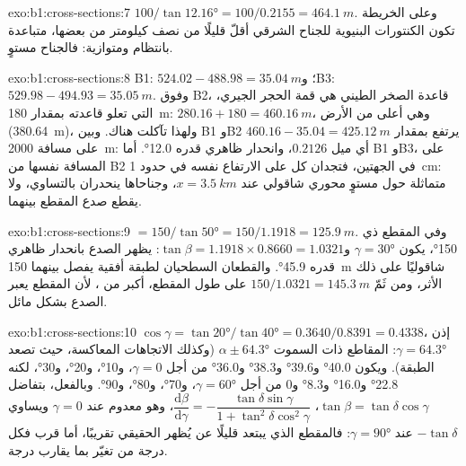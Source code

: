 \begin{solution}{exo:b1:cross-sections:7}
$100/\tan\ang{12.16} = 100/0.2155 = \qty{464.1}{m}$. وعلى الخريطة تكون الكنتورات البنيوية للجناح الشرقي أقلّ قليلًا من نصف كيلومتر من بعضها، متباعدة بانتظام ومتوازية: فالجناح مستوٍ.
\end{solution}

\begin{solution}{exo:b1:cross-sections:8}
B1: $524.02 - 488.98 = \qty{35.04}{m}$؛ وB3: $529.98 - 494.93 =
\qty{35.05}{m}$. وفوق B2، قاعدة الصخر الطيني هي قمة الحجر الجيري، التي تعلو قاعدته بمقدار \qty{180}{m}: $280.16 + 180 = \qty{460.16}{m}$،
وهي أعلى من الأرض (\qty{380.64}{m})، ولهذا تآكلت هناك. وبين B1 وB2 يرتفع  بمقدار $460.16 - 35.04 = \qty{425.12}{m}$
على مسافة \qty{2000}{m}: أي ميل $0.2126$، وانحدار ظاهري قدره \ang{12.0}. أما B1 وB3، على المسافة نفسها من B2 في الجهتين، فتجدان كل  على الارتفاع نفسه في حدود \qty{1}{cm}:  متماثلة حول مستوٍ محوري شاقولي عند $x = \qty{3.5}{km}$، وجناحاها ينحدران بالتساوي، ولا يقطع صدع المقطع بينهما.
\end{solution}

\begin{solution}{exo:b1:cross-sections:9}
 $= 150/\tan\ang{50} = 150/1.1918 = \qty{125.9}{m}$. وفي المقطع ذي  \ang{150}، يكون $\gamma = \ang{30}$ و$\tan\beta = 1.1918\times0.8660 =
1.0321$: يظهر الصدع بانحدار ظاهري قدره \ang{45.9}. والقطعان السطحيان لطبقة أفقية يفصل بينهما \qty{150}{m} شاقوليًا على ذلك الأثر، ومن ثَمّ $150/1.0321 = \qty{145.3}{m}$ على طول المقطع، أكبر من ، لأن المقطع يعبر الصدع بشكل مائل.
\end{solution}

\begin{solution}{exo:b1:cross-sections:10}
$\cos\gamma = \tan\ang{20}/\tan\ang{40} = 0.3640/0.8391 = 0.4338$، إذن
$\gamma = \ang{64.3}$: المقاطع ذات السموت $\alpha \pm \ang{64.3}$ (وكذلك الاتجاهات المعاكسة، حيث تصعد الطبقة). ويكون 
\ang{40.0} و\ang{39.6} و\ang{38.3} و\ang{36.0} من أجل $\gamma = 0$، و\ang{10}، و\ang{20}، و\ang{30}، لكنه \ang{22.8} و\ang{16.0} و\ang{8.3} و$0$ من أجل
$\gamma = \ang{60}$، و\ang{70}، و\ang{80}، و\ang{90}. وبالفعل، بتفاضل
$\tan\beta = \tan\delta\cos\gamma$،
$\dfrac{\mathrm d\beta}{\mathrm d\gamma} =
-\dfrac{\tan\delta\sin\gamma}{1 + \tan^2\delta\cos^2\gamma}$، وهو معدوم
عند $\gamma = 0$ ويساوي $-\tan\delta$ عند $\gamma = \ang{90}$: فالمقطع الذي يبتعد قليلًا عن  يُظهر  الحقيقي تقريبًا، أما قرب  فكل درجة من  تغيّر  بما يقارب درجة.
\end{solution}

